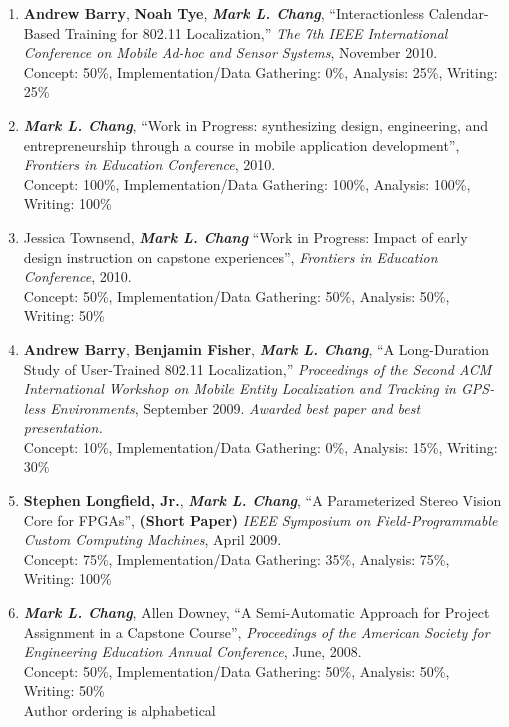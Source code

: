\documentclass[line]{res}
\begin{document}
\begin{resume}
\begin{enumerate}
		\item \textbf{Andrew Barry}, \textbf{Noah Tye}, \textbf{\textit{Mark L. Chang}}, ``Interactionless Calendar-Based Training for 802.11 Localization,'' \textit{The 7th IEEE International Conference on Mobile Ad-hoc and Sensor Systems}, November 2010.\\
		Concept: 50\%, Implementation/Data Gathering: 0\%, Analysis: 25\%, Writing: 25\%
		
		\item \textbf{\textit{Mark L. Chang}}, ``Work in Progress: synthesizing design, engineering, and entrepreneurship through a course in mobile application development'', \textit{Frontiers in Education Conference}, 2010.\\
		Concept: 100\%, Implementation/Data Gathering: 100\%, Analysis: 100\%, Writing: 100\%
		
		\item Jessica Townsend, \textbf{\textit{Mark L. Chang}} ``Work in Progress: Impact of early design instruction on capstone experiences'', \textit{Frontiers in Education Conference}, 2010.\\
		Concept: 50\%, Implementation/Data Gathering: 50\%, Analysis: 50\%, Writing: 50\%
		
		\item \textbf{Andrew Barry}, \textbf{Benjamin Fisher}, \textbf{\textit{Mark L. Chang}}, ``A Long-Duration Study of User-Trained 802.11 Localization,'' \emph{Proceedings of the Second ACM International Workshop on Mobile Entity Localization and Tracking in GPS-less Environments}, September 2009. \textit{Awarded best paper and best presentation.}\\
		Concept: 10\%, Implementation/Data Gathering: 0\%, Analysis: 15\%, Writing: 30\%
		
		\item \textbf{Stephen Longfield, Jr.}, \textbf{\textit{Mark L. Chang}}, ``A Parameterized Stereo Vision Core for \mbox{FPGAs}'', \textbf{(Short Paper)} \emph{IEEE Symposium on Field-Programmable Custom Computing Machines}, April 2009.\\
		Concept: 75\%, Implementation/Data Gathering: 35\%, Analysis: 75\%, Writing: 100\%
		
		\item \textbf{\textit{Mark L. Chang}}, Allen Downey, ``A Semi-Automatic Approach for Project Assignment in a Capstone Course'', \emph{Proceedings of the American Society for Engineering Education Annual Conference}, June, 2008.\\
		Concept: 50\%, Implementation/Data Gathering: 50\%, Analysis: 50\%, Writing: 50\%\\
		Author ordering is alphabetical
		

\end{enumerate}
\end{resume}
\end{document}
